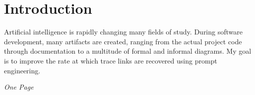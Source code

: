 
\chapter{Introduction}
\label{ch:Introduction}

Artificial intelligence is rapidly changing many fields of study.
During software development, many artifacts are created, ranging from the actual project code through documentation to a multitude of formal and informal diagrams. My goal is to improve the rate at which trace links are recovered using prompt engineering.

\textit{One Page}